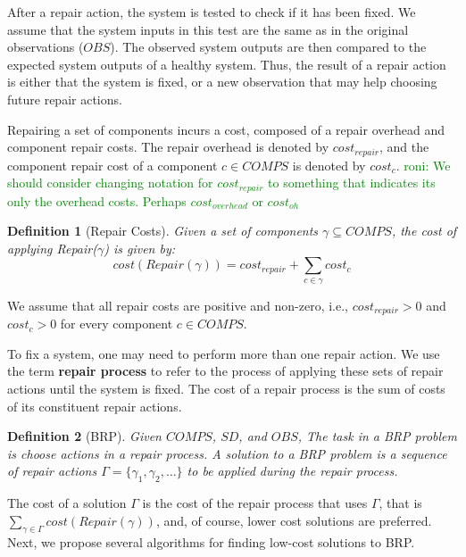\documentclass[review]{elsarticle}
\newcommand\roni[1]{\textcolor{green}{roni: #1}}
\newtheorem{definition}{Definition}
\newcommand{\cost}{\textit{cost}}
\newcommand{\COMPS}{\textit{COMPS}}
\newcommand{\SD}{\textit{SD}}
\newcommand{\OBS}{\textit{OBS}}
\begin{document}
After a repair action, the system is tested to check if it has been fixed.
We assume that the system inputs in this test are the same as in the original observations ($\OBS$). The observed system outputs are then compared to the expected system outputs of a healthy system. Thus, the result of a repair action is either that the system is fixed, or a new observation that may help choosing future repair actions.


Repairing a set of components incurs a cost, composed of a repair overhead and component repair costs. The repair overhead is denoted by $\cost_{repair}$, and the component repair cost of a component $c\in \COMPS$ is denoted by $\cost_{c}$.
\roni{We should consider changing notation for $\cost_{repair}$ to something that indicates its only the overhead costs. Perhaps $\cost_{overhead}$ or $\cost_{oh}$}

\begin{definition}[Repair Costs]
Given a set of components $\gamma\subseteq \COMPS$, the cost of applying  Repair($\gamma$) is given by:
\[ \cost(Repair(\gamma)) = \cost_{repair} + \sum_{c\in \gamma} \cost_{c} \]
\end{definition}
We assume that all repair costs are positive and non-zero, i.e., $\cost_{repair}>0$ and $\cost_{c}>0$ for every component $c \in \COMPS$. 



To fix a system, one may need to perform more than one repair action. We use the term {\bf repair process} to refer to the process of applying these sets of repair actions until the system is fixed. The cost of a repair process is the sum of costs of its constituent repair actions. 



\begin{definition}[BRP] 
Given $\COMPS$, $\SD$, and $\OBS$, 
The task in a BRP problem is choose actions in a repair process. 
A solution to a BRP problem is a sequence of repair actions $\Gamma=\{\gamma_1, \gamma_2, \ldots\}$ to be applied during the repair process. 
\end{definition}
The cost of a solution $\Gamma$ is the cost of the repair process that uses $\Gamma$, that is $\sum_{\gamma\in\Gamma} \cost(Repair(\gamma))$, and, of course, lower cost solutions are preferred. 
Next, we propose several algorithms for finding low-cost solutions to BRP. 
\end{document}

